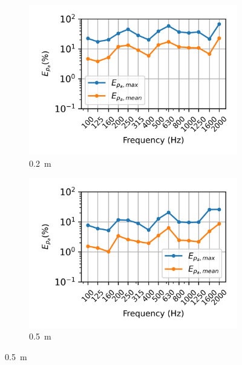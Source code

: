 \begin{figure}
	\centering
	\begin{subfigure}[b]{0.48\textwidth}
		\centering
		\includegraphics{fig/chap4/simulation_domain/width_0pt2m.png}
		\caption{\SI{0.2}{\meter}}
	\end{subfigure}
	\hfill
	\begin{subfigure}[b]{0.48\textwidth}
		\centering
		\includegraphics{fig/chap4/simulation_domain/width_0pt5m.png}
		\caption{\SI{0.5}{\meter}}
	\end{subfigure}
	

\end{figure}
